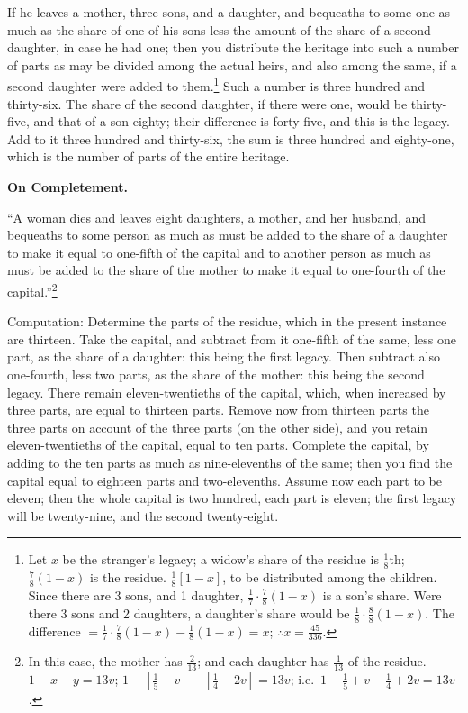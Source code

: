 If he leaves a mother, three sons, and a daughter, and bequeaths to some one as much as the share of one of his sons less the amount of the share of a second daughter, in case he had one; then you distribute the heritage into such a number of parts as may be divided among the actual heirs, and also among the same, if a second daughter were added to them.\footnote{Let $x$ be the stranger's legacy; a widow's share of the residue is $\frac{1}{8}$th; $\frac{7}{8}(1-x)$ is the residue. $\frac{1}{8}[1-x]$, to be distributed among the children. Since there are 3 sons, and 1 daughter, $\frac{1}{7} \cdot \frac{7}{8}(1-x)$ is a son's share. Were there 3 sons and 2 daughters, a daughter's share would be $\frac{1}{8} \cdot \frac{8}{8}(1-x)$. The difference $= \frac{1}{7} \cdot \frac{7}{8}(1-x) - \frac{1}{8}(1-x) = x$; $\therefore x = \frac{45}{336}$.} Such a number is three hundred and thirty-six. The share of the second daughter, if there were one, would be thirty-five, and that of a son eighty; their difference is forty-five, and this is the legacy. Add to it three hundred and thirty-six, the sum is three hundred and eighty-one, which is the number of parts of the entire heritage.

\vspace{0.3cm}
\noindent\textbf{On Completement.}

``A woman dies and leaves eight daughters, a mother, and her husband, and bequeaths to some person as much as must be added to the share of a daughter to make it equal to one-fifth of the capital and to another person as much as must be added to the share of the mother to make it equal to one-fourth of the capital.''\footnote{In this case, the mother has $\frac{2}{13}$; and each daughter has $\frac{1}{13}$ of the residue. $1 - x - y = 13v$; $1 - [\frac{1}{5} - v] - [\frac{1}{4} - 2v] = 13v$; i.e.~$1 - \frac{1}{5} + v - \frac{1}{4} + 2v = 13v$.}

Computation: Determine the parts of the residue, which in the present instance are thirteen. Take the capital, and subtract from it one-fifth of the same, less one part, as the share of a daughter: this being the first legacy. Then subtract also one-fourth, less two parts, as the share of the mother: this being the second legacy. There remain eleven-twentieths of the capital, which, when increased by three parts, are equal to thirteen parts. Remove now from thirteen parts the three parts on account of the three parts (on the other side), and you retain eleven-twentieths of the capital, equal to ten parts. Complete the capital, by adding to the ten parts as much as nine-elevenths of the same; then you find the capital equal to eighteen parts and two-elevenths. Assume now each part to be eleven; then the whole capital is two hundred, each part is eleven; the first legacy will be twenty-nine, and the second twenty-eight.

